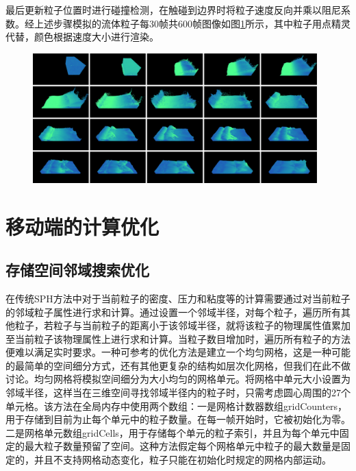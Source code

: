 最后更新粒子位置时进行碰撞检测，在触碰到边界时将粒子速度反向并乘以阻尼系数。经上述步骤模拟的流体粒子每30帧共600帧图像如图\ref{fig:paritcleSim}所示，其中粒子用点精灵代替，颜色根据速度大小进行渲染。
\begin{figure}[ht]
 \centering
 \includegraphics[height=5cm]{image/pic3.png}
 \label{fig:paritcleSim}
\end{figure}


\section{移动端的计算优化}
\subsection{存储空间邻域搜索优化}\label{optim}

在传统SPH方法中对于当前粒子的密度、压力和粘度等的计算需要通过对当前粒子的邻域粒子属性进行求和计算。通过设置一个邻域半径，对每个粒子，遍历所有其他粒子，若粒子与当前粒子的距离小于该邻域半径，就将该粒子的物理属性值累加至当前粒子该物理属性上进行求和计算。当粒子数目增加时，遍历所有粒子的方法便难以满足实时要求。一种可参考的优化方法是建立一个均匀网格，这是一种可能的最简单的空间细分方式，还有其他更复杂的结构如层次化网格，但我们在此不做讨论。均匀网格将模拟空间细分为大小均匀的网格单元。将网格中单元大小设置为邻域半径，这样当在三维空间寻找邻域半径内的粒子时，只需考虑圆心周围的27个单元格。该方法在全局内存中使用两个数组：一是网格计数器数组gridCounters，用于存储到目前为止每个单元中的粒子数量。在每一帧开始时，它被初始化为零。二是网格单元数组gridCells，用于存储每个单元的粒子索引，并且为每个单元中固定的最大粒子数量预留了空间。这种方法假定每个网格单元中粒子的最大数量是固定的，并且不支持网格动态变化，粒子只能在初始化时规定的网格内部运动。

